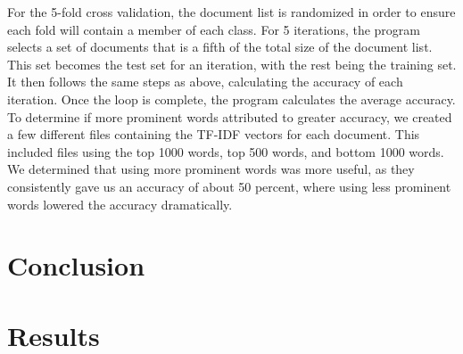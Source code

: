 \documentclass[12pt]{article}
\begin{document}
\indent For the 5-fold cross validation, the document list is randomized in order to ensure each fold will contain a member of each class. For 5 iterations, the program selects a set of documents that is a fifth of the total size of the document list. This set becomes the test set for an iteration, with the rest being the training set. It then follows the same steps as above, calculating the accuracy of each iteration. Once the loop is complete, the program calculates the average accuracy.\\
\indent To determine if more prominent words attributed to greater accuracy, we created a few different files containing the TF-IDF vectors for each document. This included files using the top 1000 words, top 500 words, and bottom 1000 words. We determined that using more prominent words was more useful, as they consistently gave us an accuracy of about 50 percent, where using less prominent words lowered the accuracy dramatically.\\

\section{Conclusion} 

\section{Results}


\begin{thebibliography}{9}


\end{thebibliography}
\end{document}
